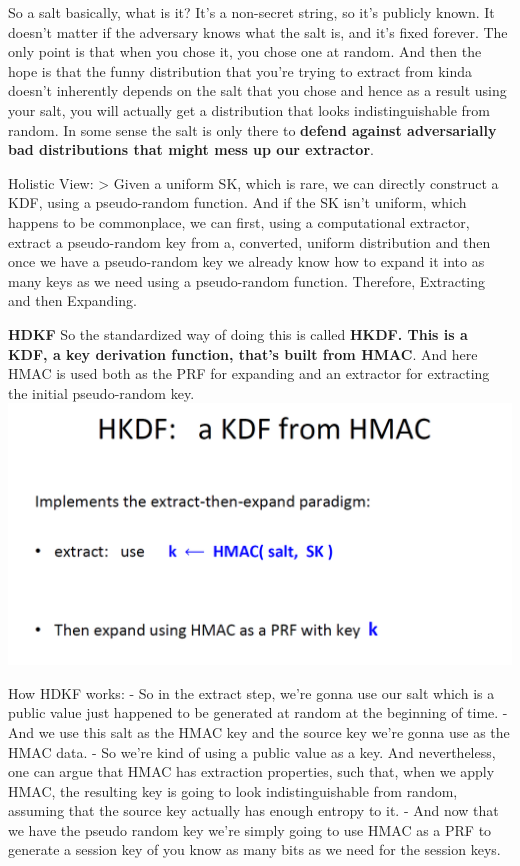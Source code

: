 \documentclass[11pt]{article}
\makeatletter
\def\maxwidth{\ifdim\Gin@nat@width>\linewidth\linewidth
    \else\Gin@nat@width\fi}
\let\Oldincludegraphics\includegraphics
\renewcommand{\includegraphics}[1]{\Oldincludegraphics[width=.8\maxwidth]{#1}}
\makeatother
\begin{document}
So a salt basically, what is it? It's a non-secret string, so it's
publicly known. It doesn't matter if the adversary knows what the salt
is, and it's fixed forever. The only point is that when you chose it,
you chose one at random. And then the hope is that the funny
distribution that you're trying to extract from kinda doesn't inherently
depends on the salt that you chose and hence as a result using your
salt, you will actually get a distribution that looks indistinguishable
from random. In some sense the salt is only there to \textbf{defend
against adversarially bad distributions that might mess up our
extractor}.

Holistic View: \textgreater{} Given a uniform SK, which is rare, we can
directly construct a KDF, using a pseudo-random function. And if the SK
isn't uniform, which happens to be commonplace, we can first, using a
computational extractor, extract a pseudo-random key from a, converted,
uniform distribution and then once we have a pseudo-random key we
already know how to expand it into as many keys as we need using a
pseudo-random function. Therefore, Extracting and then Expanding.

\textbf{HDKF} So the standardized way of doing this is called
\textbf{HKDF. This is a KDF, a key derivation function, that's built
from HMAC}. And here HMAC is used both as the PRF for expanding and an
extractor for extracting the initial pseudo-random key.
\includegraphics{./Images/HKDF.png}

How HDKF works: - So in the extract step, we're gonna use our salt which
is a public value just happened to be generated at random at the
beginning of time. - And we use this salt as the HMAC key and the source
key we're gonna use as the HMAC data. - So we're kind of using a public
value as a key. And nevertheless, one can argue that HMAC has extraction
properties, such that, when we apply HMAC, the resulting key is going to
look indistinguishable from random, assuming that the source key
actually has enough entropy to it. - And now that we have the pseudo
random key we're simply going to use HMAC as a PRF to generate a session
key of you know as many bits as we need for the session keys.
\end{document}
